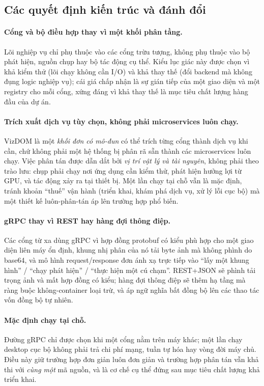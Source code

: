 \documentclass[11pt,a4paper]{article}
\begin{document}
\subsection{Các quyết định kiến trúc và đánh đổi}
\paragraph{Cổng và bộ điều hợp thay vì một khối phân tầng.} Lõi nghiệp vụ chỉ phụ
thuộc vào các cổng trừu tượng, không phụ thuộc vào bộ phát hiện, nguồn chụp hay bộ
tác động cụ thể. Kiểu lục giác này được chọn vì khả kiểm thử (lõi chạy không cần
I/O) và khả thay thế (đổi backend mà không đụng logic nghiệp vụ); cái giá chấp nhận
là sự gián tiếp của một giao diện và một registry cho mỗi cổng, xứng đáng vì khả
thay thế là mục tiêu chất lượng hàng đầu của dự án.

\paragraph{Trích xuất dịch vụ tùy chọn, không phải microservices luôn chạy.} VizDOM
là một \emph{khối đơn có mô-đun} có thể trích từng cổng thành dịch vụ khi cần, chứ
không phải một hệ thống bị phân rã sẵn thành các microservices luôn chạy. Việc phân
tán được dẫn dắt bởi \emph{vị trí vật lý và tài nguyên}, không phải theo trào lưu:
chụp phải chạy nơi ứng dụng cần kiểm thử, phát hiện hưởng lợi từ GPU, và tác động xảy
ra tại thiết bị. Một lần chạy tại chỗ vẫn là mặc định, tránh khoản ``thuế'' vận hành
(triển khai, khám phá dịch vụ, xử lý lỗi cục bộ) mà một thiết kế luôn-phân-tán áp lên
trường hợp phổ biến.

\paragraph{gRPC thay vì REST hay hàng đợi thông điệp.} Các cổng từ xa dùng gRPC vì
hợp đồng protobuf có kiểu phù hợp cho một giao diện liên máy ổn định, khung nhị phân
của nó tải byte ảnh mà không phình do base64, và mô hình request/response đơn ánh xạ
trực tiếp vào ``lấy một khung hình'' / ``chạy phát hiện'' / ``thực hiện một cú chạm''.
REST+JSON sẽ phình tải trọng ảnh và mất hợp đồng có kiểu; hàng đợi thông điệp sẽ thêm
hạ tầng mà ràng buộc không-container loại trừ, và áp ngữ nghĩa bất đồng bộ lên các
thao tác vốn đồng bộ tự nhiên.

\paragraph{Mặc định chạy tại chỗ.} Đường gRPC chỉ được chọn khi một cổng nằm trên
máy khác; một lần chạy desktop cục bộ không phải trả chi phí mạng, tuần tự hóa hay
vòng đời máy chủ. Điều này giữ trường hợp đơn giản luôn đơn giản và trường hợp phân
tán vẫn khả thi với \emph{cùng một} mã nguồn, và là cơ chế cụ thể đứng sau mục tiêu
chất lượng khả triển khai.
\end{document}
